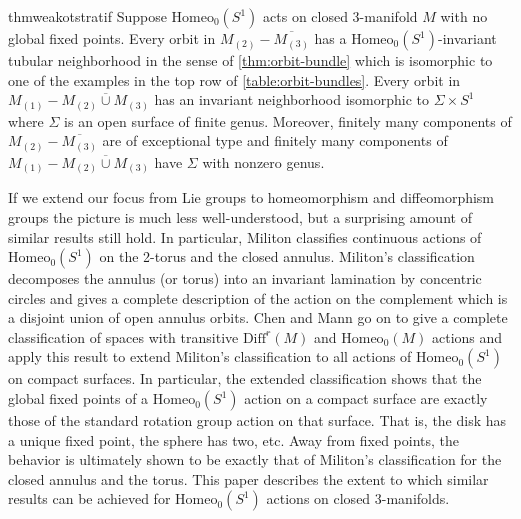 \documentclass[10pt, oneside]{article}
\newcommand{\homeo}[1][S^1]{\text{Homeo}_0(#1)}
\newcommand{\diffr}[1][M]{\text{Diff}^r(#1)}
\newcommand{\cl}[1]{\overline{#1}}
\theoremstyle{definition}
\theoremstyle{definition}
\begin{document}
\begin{restatable}{thm}{weakotstratif}
\label{thm:weak-o-t-strat}
    Suppose $\homeo$ acts on closed 3-manifold $M$ with no global fixed points. Every orbit in $M_{(2)} - \cl{M_{(3)}}$ has a $\homeo$-invariant tubular neighborhood in the sense of \cref{thm:orbit-bundle} which is isomorphic to one of the examples in the top row of \cref{table:orbit-bundles}. Every orbit in $M_{(1)} - \cl{M_{(2)}\cup M_{(3)}}$ has an invariant neighborhood isomorphic to $\Sigma \times S^1$ where $\Sigma$ is an open surface of finite genus. Moreover, finitely many components of $M_{(2)} - \cl{M_{(3)}}$ are of exceptional type and finitely many components of $M_{(1)} - \cl{M_{(2)}\cup M_{(3)}}$ have $\Sigma$ with nonzero genus.
\end{restatable}

If we extend our focus from Lie groups to homeomorphism and diffeomorphism groups the picture is much less well-understood, but a surprising amount of similar results still hold. In particular, Militon \cite{militon:ActionsGroup} classifies continuous actions of $\homeo$ on the 2-torus and the closed annulus. Militon's classification decomposes the annulus (or torus) into an invariant lamination by concentric circles and gives a complete description of the action on the complement which is a disjoint union of open annulus orbits. Chen and Mann \cite{chen:StructureTheorems} go on to give a complete classification of spaces with transitive $\diffr$ and $\homeo[M]$ actions and apply this result to extend Militon's classification to all actions of $\homeo$ on compact surfaces. In particular, the extended classification shows that the global fixed points of a $\homeo$ action on a compact surface are exactly those of the standard rotation group action on that surface. That is, the disk has a unique fixed point, the sphere has two, etc. Away from fixed points, the behavior is ultimately shown to be exactly that of Militon's classification for the closed annulus and the torus. This paper describes the extent to which similar results can be achieved for $\homeo$ actions on closed 3-manifolds.
\end{document}
